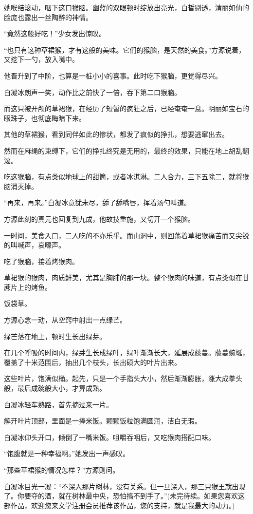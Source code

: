 \begin{this_body}
她喉结滚动，咽下这口猴脑。幽蓝的双眼顿时绽放出亮光，白皙剔透，清丽如仙的脸庞也露出一丝陶醉的神情。

“竟然这般好吃！”少女发出惊叹。

“也只有这种草裙猴，才有这般的美味。它们的猴脑，是天然的美食。”方源说着，又挖下一勺，放入嘴中。

他晋升到了中阶，也算是一桩小小的喜事。此时吃下猴脑，更觉得尽兴。

白凝冰朗声一笑，动作比之前快了一倍，吞下第二口猴脑。

而这只被开颅的草裙猴，在经历了短暂的疯狂之后，已经奄奄一息。明丽如宝石的眼珠子，也彻底晦暗下来。

其他的草裙猴，看到同伴如此的惨状，都发了疯似的挣扎，想要逃窜出去。

然而在麻绳的束缚下，它们的挣扎终究是无用的，最终的效果，只能在地上胡乱翻滚。

吃这猴脑，有点类似地球上的甜筒，或者冰淇淋。二人合力，三下五除二，就将猴脑消灭掉。

“再来，再来。”白凝冰意犹未尽，舔了舔嘴唇，挥着汤勺叫道。

方源此刻的真元也回复到九成，他故技重施，又切开一个猴脑。

一时间，美食入口，二人吃的不亦乐乎。而山洞中，则回荡着草裙猴痛苦而又尖锐的叫喊声，哀嚎声。

吃了猴脑，接着烤猴肉。

草裙猴的猴肉，肉质鲜美，尤其是胸脯的那一块。整个猴肉的味道，有点类似在甘蔗片上的烤鱼。

饭袋草。

方源心念一动，从空窍中射出一点绿芒。

绿芒落在地上，顿时生长出绿芽。

在几个呼吸的时间内，绿芽生长成绿叶，绿叶渐渐长大，延展成藤蔓。藤蔓蜿蜒，覆盖了十米范围后，抽出几个枝头，长出硕大的叶片出来。

这些叶片，饱满似桶。起先，只是一个手指头大小，然后渐渐膨胀，涨大成拳头般，最后成碗般大小，才算成熟。

白凝冰轻车熟路，首先摘过来一片。

解开叶片顶部，里面是一捧米饭。颗颗饭粒饱满圆润，洁白无瑕。

白凝冰仰头开口，倾倒了一嘴米饭。咀嚼吞咽后，又吃猴肉搭配口味。

“饱腹就是一种幸福啊。”她发出一声感叹。

“那些草裙猴的情况怎样？”方源则问。

白凝冰目光一凝：“不深入那片树林，没有关系。但一旦深入，那三只猴王就出现了。你要夺的酒，就在树林最中央，恐怕搞不到手了。”(未完待续。如果您喜欢这部作品，欢迎您来文学注册会员推荐该作品，您的支持，就是我最大的动力。)

\end{this_body}

